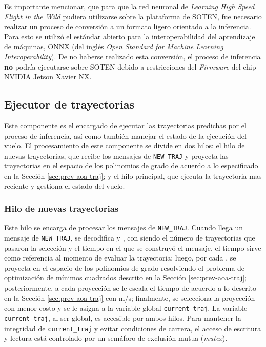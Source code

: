 Es importante mencionar, que para que la red neuronal de \textit{Learning High Speed Flight in the Wild} \cite{Loquercio2021} pudiera utilizarse sobre la plataforma de SOTEN, fue necesario realizar un proceso de conversión a un formato ligero orientado a la inferencia. Para esto se utilizó el estándar abierto para la interoperabilidad del aprendizaje de máquinas, ONNX \cite{onnx} (del inglés \textit{Open Standard for Machine Learning Interoperability}). De no haberse realizado esta conversión, el proceso de inferencia \textbf{no} podría ejecutarse sobre SOTEN debido a restricciones del \textit{Firmware} del chip NVIDIA Jetson Xavier NX.

\pagebreak

\subsection{Ejecutor de trayectorias}

Este componente es el encargado de ejecutar las trayectorias predichas por el proceso de inferencia, así como también manejar el estado de la ejecución del vuelo. El procesamiento de este componente se divide en dos hilos: el hilo de nuevas trayectorias, que recibe los mensajes de \texttt{NEW\_TRAJ} y proyecta las trayectorias en el espacio de los polinomios de grado  de acuerdo a lo especificado en la Sección \ref{sec:prev-aoa-traj}; y el hilo principal, que ejecuta la trayectoria mas reciente y gestiona el estado del vuelo.

\subsubsection{Hilo de nuevas trayectorias}

Este hilo se encarga de procesar los mensajes de \texttt{NEW\_TRAJ}. Cuando llega un mensaje de \texttt{NEW\_TRAJ}, se decodifica  y , con \jim{\beta} siendo el número  de trayectorias que pasaron la selección  y  el tiempo en el que se construyó el mensaje, el tiempo  sirve como referencia al momento de evaluar la trayectoria; luego, por cada , se proyecta  en el espacio de los polinomios de grado  resolviendo el problema de optimización de mínimos cuadrados descrito en la Sección \ref{sec:prev-aoa-traj}; posteriormente, a cada proyección  se le escala el tiempo  de acuerdo a lo descrito en la Sección \ref{sec:prev-aoa-traj} con  m/s; finalmente, se selecciona la proyección con menor costo  y se le asigna a la variable global \texttt{current\_traj}. La variable \texttt{current\_traj}, al ser global, es accesible por ambos hilos. Para mantener la integridad de \texttt{current\_traj} y evitar condiciones de carrera,  el acceso de escritura y lectura está controlado por un semáforo de exclusión mutua (\textit{mutex}).

